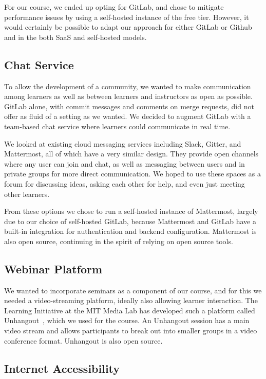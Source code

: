 \documentclass[12pt,twoside]{mitthesis}
\newcommand{\draft}[1]{{\color{blue} #1}}
\begin{document}
For our course, we ended up opting for GitLab, and chose to mitigate performance issues by using a self-hosted instance of the free tier. However, it would certainly be possible to adapt our approach for either GitLab or Github and in the both SaaS and self-hosted models.

\subsection{Chat Service}

To allow the development of a community, we wanted to make communication among learners as well as between learners and instructors as open as possible. GitLab alone, with commit messages and comments on merge requests, did not offer as fluid of a setting as we wanted. We decided to augment GitLab with a team-based chat service where learners could communicate in real time.

We looked at existing cloud messaging services including Slack, Gitter, and Mattermost, all of which have a very similar design. They provide open channels where any user can join and chat, as well as messaging between users and in private groups for more direct communication. We hoped to use these spaces as a forum for discussing ideas, asking each other for help, and even just meeting other learners.

From these options we chose to run a self-hosted instance of Mattermost, largely due to our choice of self-hosted GitLab, because Mattermost and GitLab have a built-in integration for authentication and backend configuration. Mattermost is also open source, continuing in the spirit of relying on open source tools.

\subsection{Webinar Platform}

\draft{We wanted to incorporate seminars as a component of our course, and for this we needed a video-streaming platform, ideally also allowing learner interaction. The Learning Initiative at the MIT Media Lab has developed such a platform called Unhangout~\cite{unhangout}, which we used for the course. An Unhangout session has a main video stream and allows participants to break out into smaller groups in a video conference format. Unhangout is also open source.}

\subsection{Internet Accessibility}
\end{document}
